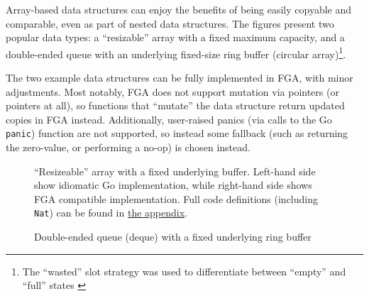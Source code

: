 Array-based data structures can enjoy the benefits of being easily copyable and
comparable, even as part of nested data structures. The figures present two
popular data types: a ``resizable'' array with a fixed maximum capacity, and a
double-ended queue with an underlying fixed-size ring buffer (circular
array)\footnote{The ``wasted'' slot strategy was used to differentiate between
	``empty'' and ``full'' states \autocite{ringBuffer}}.

The two example data structures can be fully implemented in FGA, with minor
adjustments. Most notably, FGA does not support mutation via pointers (or
pointers at all), so functions that ``mutate'' the data structure return updated
copies in FGA instead. Additionally, user-raised panics (via calls to the Go
\texttt{panic}) function are not supported, so instead some fallback (such as
returning the zero-value, or performing a no-op) is chosen instead.

\begin{figure}
	\noindent\begin{minipage}[t]{.45\linewidth}
		
	\end{minipage}
	\hfill
	\noindent\begin{minipage}[t]{.45\linewidth}
		
	\end{minipage}
	\caption{ ``Resizeable'' array with a fixed underlying buffer. Left-hand side
		show idiomatic Go implementation, while right-hand side shows FGA
		compatible implementation. Full code definitions (including
		\texttt{Nat}) can be found in \hyperref[sec:fg-resizable-array-code]{the
			appendix}.}
\end{figure}

\begin{figure}
	\caption{Double-ended queue (deque) with a fixed underlying ring buffer}
\end{figure}
